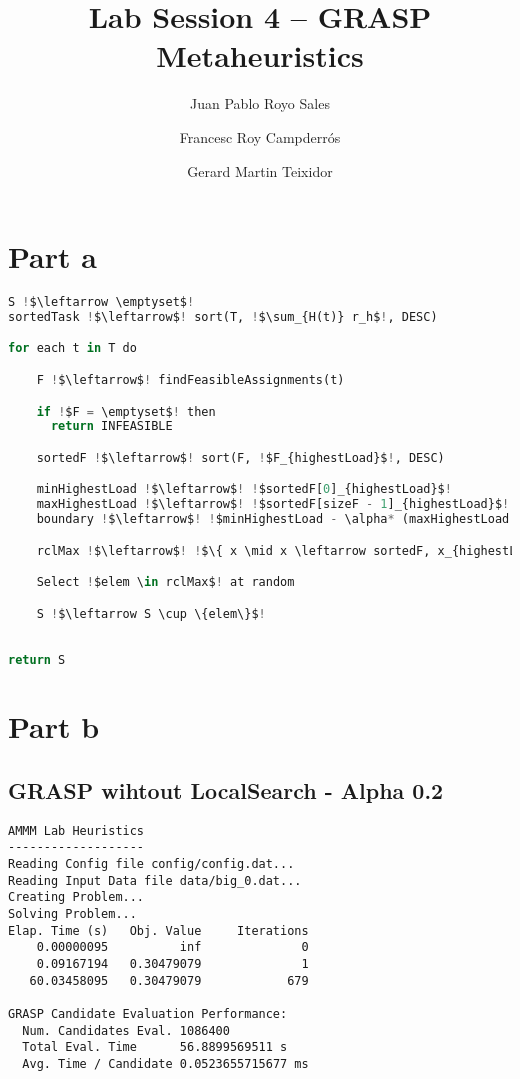 \documentclass{article}
\title{Lab Session 4 – GRASP Metaheuristics}
\author{Juan Pablo Royo Sales \and Francesc Roy Campderrós \and Gerard Martin Teixidor}
\begin{document}
\maketitle

\section{Part a}
\begin{lstlisting}[language=Python]
S !$\leftarrow \emptyset$!
sortedTask !$\leftarrow$! sort(T, !$\sum_{H(t)} r_h$!, DESC)

for each t in T do

    F !$\leftarrow$! findFeasibleAssignments(t)

    if !$F = \emptyset$! then
      return INFEASIBLE

    sortedF !$\leftarrow$! sort(F, !$F_{highestLoad}$!, DESC) 

    minHighestLoad !$\leftarrow$! !$sortedF[0]_{highestLoad}$!
    maxHighestLoad !$\leftarrow$! !$sortedF[sizeF - 1]_{highestLoad}$!
    boundary !$\leftarrow$! !$minHighestLoad - \alpha* (maxHighestLoad - minHighestLoad)$!

    rclMax !$\leftarrow$! !$\{ x \mid x \leftarrow sortedF, x_{highestLoad} \ge boundary\}$!  

    Select !$elem \in rclMax$! at random

    S !$\leftarrow S \cup \{elem\}$!

 
return S
\end{lstlisting}

\section{Part b}
\subsection{GRASP wihtout LocalSearch - Alpha 0.2}
\begin{lstlisting}
AMMM Lab Heuristics
-------------------
Reading Config file config/config.dat...
Reading Input Data file data/big_0.dat...
Creating Problem...
Solving Problem...
Elap. Time (s)   Obj. Value     Iterations
    0.00000095          inf              0
    0.09167194   0.30479079              1
   60.03458095   0.30479079            679

GRASP Candidate Evaluation Performance:
  Num. Candidates Eval. 1086400
  Total Eval. Time      56.8899569511 s
  Avg. Time / Candidate 0.0523655715677 ms
\end{lstlisting}
\end{document}
